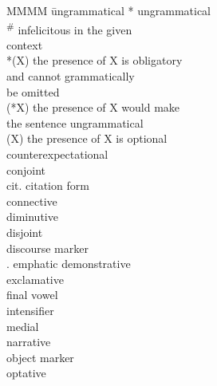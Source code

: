 \documentclass[output=paper]{langscibook}
\begin{document}
\begin{multicols}{2}
\begin{tabbing}
MMMM \= ungrammatical\kill
* \> ungrammatical\\
\textsuperscript{\#} \> infelicitous in the given \\ \> context\\
*(X) \> the presence of X is obligatory \\ \>  and cannot grammatically \\ \>  be omitted\\
(*X) \> the presence of X would make\\ \>  the sentence ungrammatical\\
(X) \> the presence of X is optional\\
\CE{} \> counterexpectational\\
\CJ{} \> conjoint\\
cit. \> citation form\\
\CONN{} \> connective\\
\DIM{} \> diminutive\\
\DJ{} \> disjoint\\
\DM{} \> discourse marker\\
\E.\DEM{} \> emphatic demonstrative\\
\EXCLAM{} \> exclamative\\
\FV{} \> final vowel\\
\INT{} \> intensifier\\
\MED{} \> medial\\
\NARR{} \> narrative\\
\OM{} \> object marker\\
\OPT{} \> optative\\

\end{tabbing}
\end{multicols}
\end{document}
